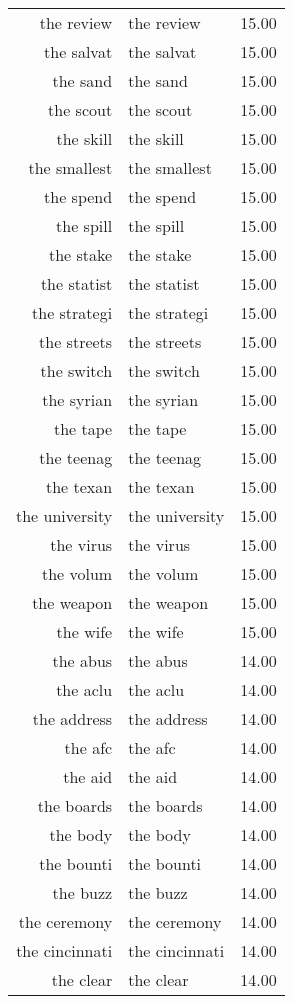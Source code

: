 \begin{table}[ht]
\begin{tabular}{rlr}
  the review & the review & 15.00 \\ 
  the salvat & the salvat & 15.00 \\ 
  the sand & the sand & 15.00 \\ 
  the scout & the scout & 15.00 \\ 
  the skill & the skill & 15.00 \\ 
  the smallest & the smallest & 15.00 \\ 
  the spend & the spend & 15.00 \\ 
  the spill & the spill & 15.00 \\ 
  the stake & the stake & 15.00 \\ 
  the statist & the statist & 15.00 \\ 
  the strategi & the strategi & 15.00 \\ 
  the streets & the streets & 15.00 \\ 
  the switch & the switch & 15.00 \\ 
  the syrian & the syrian & 15.00 \\ 
  the tape & the tape & 15.00 \\ 
  the teenag & the teenag & 15.00 \\ 
  the texan & the texan & 15.00 \\ 
  the university & the university & 15.00 \\ 
  the virus & the virus & 15.00 \\ 
  the volum & the volum & 15.00 \\ 
  the weapon & the weapon & 15.00 \\ 
  the wife & the wife & 15.00 \\ 
  the abus & the abus & 14.00 \\ 
  the aclu & the aclu & 14.00 \\ 
  the address & the address & 14.00 \\ 
  the afc & the afc & 14.00 \\ 
  the aid & the aid & 14.00 \\ 
  the boards & the boards & 14.00 \\ 
  the body & the body & 14.00 \\ 
  the bounti & the bounti & 14.00 \\ 
  the buzz & the buzz & 14.00 \\ 
  the ceremony & the ceremony & 14.00 \\ 
  the cincinnati & the cincinnati & 14.00 \\ 
  the clear & the clear & 14.00 \\ 

\end{tabular}
\end{table}
